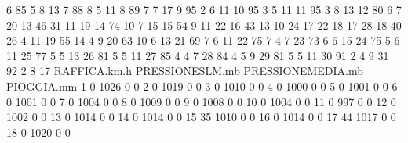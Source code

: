 \documentclass[onecolumn,12pt]{book}
\begin{document}
\begin{Schunk}
\begin{Soutput}
6         85             5               8            13
7         88             8               5            11
8         89             7               7            17
9         95             2               6            11
10        95             3               5            11
11        95             3               8            13
12        80             6               7            20
13        46            31              11            19
14        74            10               7            15
15        54             9              11            22
16        43            13              10            24
17        22            18              17            28
18        40            26               4            11
19        55            14               4             9
20        63            10               6            13
21        69             7               6            11
22        75             7               4             7
23        73             6               6            15
24        75             5               6            11
25        77             5               5            13
26        81             5               5            11
27        85             4               4             7
28        84             4               5             9
29        81             5               5            11
30        91             2               4             9
31        92             2               8            17
   RAFFICA.km.h PRESSIONESLM.mb PRESSIONEMEDIA.mb PIOGGIA.mm
1             0            1026                 0          0
2             0            1019                 0          0
3             0            1010                 0          0
4             0            1000                 0          0
5             0            1001                 0          0
6             0            1001                 0          0
7             0            1004                 0          0
8             0            1009                 0          0
9             0            1008                 0          0
10            0            1004                 0          0
11            0             997                 0          0
12            0            1002                 0          0
13            0            1014                 0          0
14            0            1014                 0          0
15           35            1010                 0          0
16            0            1014                 0          0
17           44            1017                 0          0
18            0            1020                 0          0

\end{Soutput}
\end{Schunk}
\end{document}
